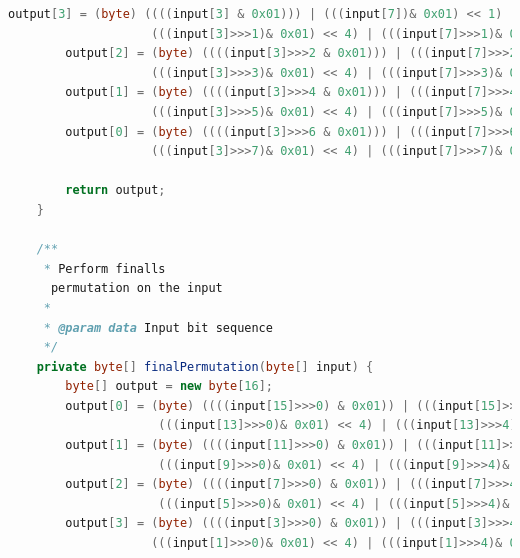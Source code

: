 \documentclass[12pt]{article} %
\begin{document}
\begin{lstlisting}[language=Java, basicstyle=\small, breaklines=true]
        output[3] = (byte) ((((input[3] & 0x01))) | (((input[7])& 0x01) << 1) | (((input[11])& 0x01) << 2) | (((input[15])& 0x01) << 3) | 
                    (((input[3]>>>1)& 0x01) << 4) | (((input[7]>>>1)& 0x01) << 5) | (((input[11]>>>1)& 0x01) << 6) | (((input[15]>>>1)& 0x01) << 7));
        output[2] = (byte) ((((input[3]>>>2 & 0x01))) | (((input[7]>>>2)& 0x01) << 1) | (((input[11]>>>2)& 0x01) << 2) | (((input[15]>>>2)& 0x01) << 3) | 
                    (((input[3]>>>3)& 0x01) << 4) | (((input[7]>>>3)& 0x01) << 5) | (((input[11]>>>3)& 0x01) << 6) | (((input[15]>>>3)& 0x01) << 7));
        output[1] = (byte) ((((input[3]>>>4 & 0x01))) | (((input[7]>>>4)& 0x01) << 1) | (((input[11]>>>4)& 0x01) << 2) | (((input[15]>>>4)& 0x01) << 3) | 
                    (((input[3]>>>5)& 0x01) << 4) | (((input[7]>>>5)& 0x01) << 5) | (((input[11]>>>5)& 0x01) << 6) | (((input[15]>>>5)& 0x01) << 7));
        output[0] = (byte) ((((input[3]>>>6 & 0x01))) | (((input[7]>>>6)& 0x01) << 1) | (((input[11]>>>6)& 0x01) << 2) | (((input[15]>>>6)& 0x01) << 3) | 
                    (((input[3]>>>7)& 0x01) << 4) | (((input[7]>>>7)& 0x01) << 5) | (((input[11]>>>7)& 0x01) << 6) | (((input[15]>>>7)& 0x01) << 7));
                    
        return output; 
    }

    /**
     * Perform finalls
      permutation on the input
     *
     * @param data Input bit sequence
     */
    private byte[] finalPermutation(byte[] input) {
        byte[] output = new byte[16];
        output[0] = (byte) ((((input[15]>>>0) & 0x01)) | (((input[15]>>>4)& 0x01) << 1) | (((input[14]>>>0)& 0x01) << 2) | (((input[14]>>>4)& 0x01) << 3) | 
                     (((input[13]>>>0)& 0x01) << 4) | (((input[13]>>>4)& 0x01) << 5) | (((input[12]>>>0)& 0x01) << 6) | (((input[12]>>>4)& 0x01) << 7));
        output[1] = (byte) ((((input[11]>>>0) & 0x01)) | (((input[11]>>>4)& 0x01) << 1) | (((input[10]>>>0)& 0x01) << 2) | (((input[10]>>>4)& 0x01) << 3) | 
                     (((input[9]>>>0)& 0x01) << 4) | (((input[9]>>>4)& 0x01) << 5) | (((input[8]>>>0)& 0x01) << 6) | (((input[8]>>>4)& 0x01) << 7));
        output[2] = (byte) ((((input[7]>>>0) & 0x01)) | (((input[7]>>>4)& 0x01) << 1) | (((input[6]>>>0)& 0x01) << 2) | (((input[6]>>>4)& 0x01) << 3) | 
                     (((input[5]>>>0)& 0x01) << 4) | (((input[5]>>>4)& 0x01) << 5) | (((input[4]>>>0)& 0x01) << 6) | (((input[4]>>>4)& 0x01) << 7));
        output[3] = (byte) ((((input[3]>>>0) & 0x01)) | (((input[3]>>>4)& 0x01) << 1) | (((input[2]>>>0)& 0x01) << 2) | (((input[2]>>>4)& 0x01) << 3) | 
                    (((input[1]>>>0)& 0x01) << 4) | (((input[1]>>>4)& 0x01) << 5) | (((input[0]>>>0)& 0x01) << 6) | (((input[0]>>>4)& 0x01) << 7));
        

\end{lstlisting}
\end{document}
